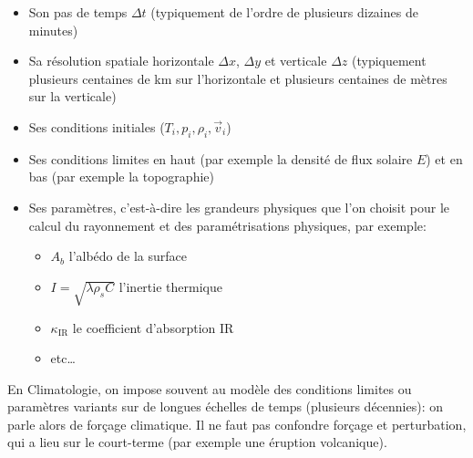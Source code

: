 \documentclass[a4paper,12pt]{article}
\begin{document}
\begin{itemize}
\item Son pas de temps $\Delta t$ (typiquement de l'ordre de plusieurs dizaines
de minutes)
\item Sa résolution spatiale horizontale $\Delta x$, $\Delta y$ et verticale
$\Delta z$ (typiquement plusieurs centaines de km sur l'horizontale et
plusieurs centaines de mètres sur la verticale)
\item Ses conditions initiales ($T_i,p_i,\rho_i,\vec{v}_i$)
\item Ses conditions limites en haut (par exemple la densité de flux solaire
$E$) et en bas (par exemple la topographie)
\item Ses paramètres, c'est-à-dire les grandeurs physiques que l'on choisit
pour le calcul du rayonnement et des paramétrisations physiques, par exemple:
\begin{itemize}
\item $A_b$ l'albédo de la surface
\item $I=\sqrt{\lambda \rho_s C}$ l'inertie thermique
\item $\kappa_\text{IR}$ le coefficient d'absorption IR
\item etc\dots
\end{itemize}
\end{itemize}

En Climatologie, on impose souvent au modèle des conditions limites ou
paramètres variants sur de longues échelles de temps (plusieurs décennies): on
parle alors de forçage climatique. Il ne faut pas confondre forçage et
perturbation, qui a lieu sur le court-terme (par exemple une éruption
volcanique).




\end{document}

